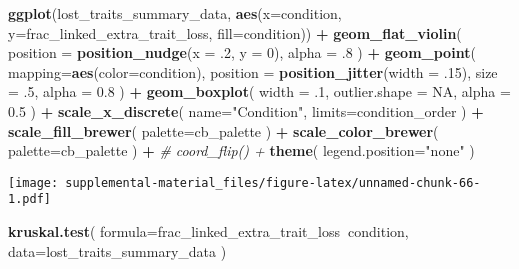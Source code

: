 \documentclass[]{book}
\newenvironment{Shaded}{\begin{snugshade}}{\end{snugshade}}
\newcommand{\CommentTok}[1]{\textcolor[rgb]{0.56,0.35,0.01}{\textit{#1}}}
\newcommand{\DataTypeTok}[1]{\textcolor[rgb]{0.13,0.29,0.53}{#1}}
\newcommand{\DecValTok}[1]{\textcolor[rgb]{0.00,0.00,0.81}{#1}}
\newcommand{\FloatTok}[1]{\textcolor[rgb]{0.00,0.00,0.81}{#1}}
\newcommand{\KeywordTok}[1]{\textcolor[rgb]{0.13,0.29,0.53}{\textbf{#1}}}
\newcommand{\NormalTok}[1]{#1}
\newcommand{\OperatorTok}[1]{\textcolor[rgb]{0.81,0.36,0.00}{\textbf{#1}}}
\newcommand{\OtherTok}[1]{\textcolor[rgb]{0.56,0.35,0.01}{#1}}
\newcommand{\StringTok}[1]{\textcolor[rgb]{0.31,0.60,0.02}{#1}}
\begin{document}
\begin{Shaded}
\begin{Highlighting}[]
\KeywordTok{ggplot}\NormalTok{(lost_traits_summary_data, }\KeywordTok{aes}\NormalTok{(}\DataTypeTok{x=}\NormalTok{condition, }\DataTypeTok{y=}\NormalTok{frac_linked_extra_trait_loss, }\DataTypeTok{fill=}\NormalTok{condition)) }\OperatorTok{+}
\StringTok{  }\KeywordTok{geom_flat_violin}\NormalTok{(}
    \DataTypeTok{position =} \KeywordTok{position_nudge}\NormalTok{(}\DataTypeTok{x =} \FloatTok{.2}\NormalTok{, }\DataTypeTok{y =} \DecValTok{0}\NormalTok{),}
    \DataTypeTok{alpha =} \FloatTok{.8}
\NormalTok{  ) }\OperatorTok{+}
\StringTok{  }\KeywordTok{geom_point}\NormalTok{(}
    \DataTypeTok{mapping=}\KeywordTok{aes}\NormalTok{(}\DataTypeTok{color=}\NormalTok{condition),}
    \DataTypeTok{position =} \KeywordTok{position_jitter}\NormalTok{(}\DataTypeTok{width =} \FloatTok{.15}\NormalTok{),}
    \DataTypeTok{size =} \FloatTok{.5}\NormalTok{,}
    \DataTypeTok{alpha =} \FloatTok{0.8}
\NormalTok{  ) }\OperatorTok{+}
\StringTok{  }\KeywordTok{geom_boxplot}\NormalTok{(}
    \DataTypeTok{width =} \FloatTok{.1}\NormalTok{,}
    \DataTypeTok{outlier.shape =} \OtherTok{NA}\NormalTok{,}
    \DataTypeTok{alpha =} \FloatTok{0.5}
\NormalTok{  ) }\OperatorTok{+}
\StringTok{  }\KeywordTok{scale_x_discrete}\NormalTok{(}
    \DataTypeTok{name=}\StringTok{"Condition"}\NormalTok{,}
    \DataTypeTok{limits=}\NormalTok{condition_order}
\NormalTok{  ) }\OperatorTok{+}
\StringTok{  }\KeywordTok{scale_fill_brewer}\NormalTok{(}
    \DataTypeTok{palette=}\NormalTok{cb_palette}
\NormalTok{  ) }\OperatorTok{+}
\StringTok{  }\KeywordTok{scale_color_brewer}\NormalTok{(}
    \DataTypeTok{palette=}\NormalTok{cb_palette}
\NormalTok{  ) }\OperatorTok{+}
\StringTok{  }\CommentTok{# coord_flip() +}
\StringTok{  }\KeywordTok{theme}\NormalTok{(}
    \DataTypeTok{legend.position=}\StringTok{"none"}
\NormalTok{  )}
\end{Highlighting}
\end{Shaded}

\texttt{[image: supplemental-material\_files/figure-latex/unnamed-chunk-66-1.pdf]}

\begin{Shaded}
\begin{Highlighting}[]
\KeywordTok{kruskal.test}\NormalTok{(}
  \DataTypeTok{formula=}\NormalTok{frac_linked_extra_trait_loss}\OperatorTok{~}\NormalTok{condition,}
  \DataTypeTok{data=}\NormalTok{lost_traits_summary_data}
\NormalTok{)}
\end{Highlighting}
\end{Shaded}
\end{document}

